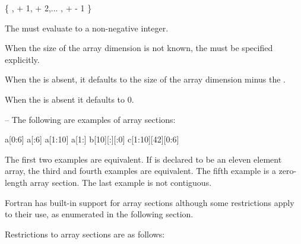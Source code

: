 \{ ,  + 1,  + 2,... ,  +  - 1 \}

The  must evaluate to a non-negative integer.

When the size of the array dimension is not known, the  must be specified 
explicitly.

When the  is absent, it defaults to the size of the array dimension minus the 
.

When the  is absent it defaults to 0.

\notestart
\noteheader – The following are examples of array sections:

\begin{indentedcodelist}
a[0:6]
a[:6]
a[1:10]
a[1:]
b[10][:][:0]
c[1:10][42][0:6]
\end{indentedcodelist}

The first two examples are equivalent. If  is declared to be an eleven element array, the 
third and fourth examples are equivalent. The fifth example is a zero-length array 
section. The last example is not contiguous.
\noteend
\medskip
\ccppspecificend

Fortran has built-in support for array sections although some
restrictions apply to their use, as enumerated in the following section.

\restrictions
Restrictions to array sections are as follows:

